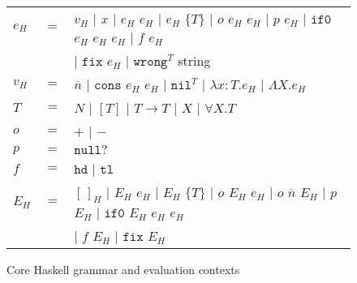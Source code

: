 \begin{figure}[p]
\centering
\begin{tabular}{lcl}
\vspace{5pt}

$e_{H}$ & $=$ & $v_{H}$ $\vert$ $x$ $\vert$ $e_{H}$ $e_{H}$ $\vert$ $e_{H}$ $\lbrace T\rbrace$ $\vert$ $o$ $e_{H}$ $e_{H}$ $\vert$ $p$ $e_{H}$ $\vert$ $\mathtt{if0}$ $e_{H}$ $e_{H}$ $e_{H}$ $\vert$ $f$ $e_{H}$ \\

\vspace{5pt}

&& $\vert$ $\mathtt{fix}$ $e_{H}$ $\vert$ $\mathtt{wrong}^{T}$ string \\

\vspace{5pt}

$v_{H}$ & $=$ & $\overline{n}$ $\vert$ $\mathtt{cons}$ $e_{H}$ $e_{H}$ $\vert$ $\mathtt{nil}^{T}$ $\vert$ $\lambda x:T.e_{H}$ $\vert$ $\Lambda X.e_{H}$ \\

\vspace{5pt}

$T$ & $=$ & $N$ $\vert$ $[T]$ $\vert$ $T\rightarrow T$ $\vert$ $X$ $\vert$ $\forall X.T$ \\

\vspace{5pt}

$o$ & $=$ & $+$ $\vert$ $-$ \\

\vspace{5pt}

$p$ & $=$ & $\mathtt{null?}$ \\

\vspace{5pt}

$f$ & $=$ & $\mathtt{hd}$ $\vert$ $\mathtt{tl}$ \\

\vspace{5pt}

$E_{H}$ & $=$ & $[\,]_{H}$ $\vert$ $E_{H}$ $e_{H}$ $\vert$ $E_{H}$ $\lbrace T\rbrace$ $\vert$ $o$ $E_{H}$ $e_{H}$ $\vert$ $o$ $\overline{n}$ $E_{H}$ $\vert$ $p$ $E_{H}$ $\vert$ $\mathtt{if0}$ $E_{H}$ $e_{H}$ $e_{H}$ \\

\vspace{5pt}

&& $\vert$ $f$ $E_{H}$ $\vert$ $\mathtt{fix}$ $E_{H}$
\end{tabular}
\caption{Core Haskell grammar and evaluation contexts}
\label{chg}
\end{figure}